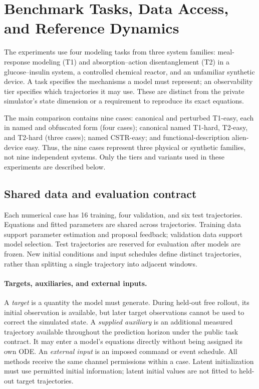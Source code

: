 \section{Benchmark Tasks, Data Access, and Reference Dynamics}
\label{app:benchmark}

The experiments use four modeling tasks from three system families: meal-response
modeling (T1) and absorption--action disentanglement (T2) in a glucose--insulin
system, a controlled chemical reactor, and an unfamiliar synthetic device.
A task specifies the mechanisms a model must represent; an observability tier
specifies which trajectories it may use. These are distinct from the private
simulator's state dimension or a requirement to reproduce its exact equations.

The main comparison contains nine cases: canonical and perturbed T1-easy, each
in named and obfuscated form (four cases); canonical named T1-hard, T2-easy, and
T2-hard (three cases); named CSTR-easy; and functional-description alien-device
easy. Thus, the nine cases represent three physical or synthetic families,
not nine independent systems. Only the tiers and variants used in these
experiments are described below.

\subsection{Shared data and evaluation contract}
\label{app:benchmark_contract}

Each numerical case has 16 training, four validation, and six test trajectories.
Equations and fitted parameters are shared across trajectories. Training data
support parameter estimation and proposal feedback; validation data support
model selection. Test trajectories are reserved for evaluation after models
are frozen. New initial conditions and input schedules define distinct
trajectories, rather than splitting a single trajectory into adjacent windows.

\paragraph{Targets, auxiliaries, and external inputs.}
A \emph{target} is a quantity the model must generate. During held-out free
rollout, its initial observation is available, but later target observations
cannot be used to correct the simulated state. A \emph{supplied auxiliary} is
an additional measured trajectory available throughout the prediction horizon
under the public task contract. It may enter a model's equations directly
without being assigned its own ODE. An \emph{external input} is an imposed
command or event schedule. All methods receive the same channel permissions
within a case. Latent initialization must use permitted initial information;
latent initial values are not fitted to held-out target trajectories.

